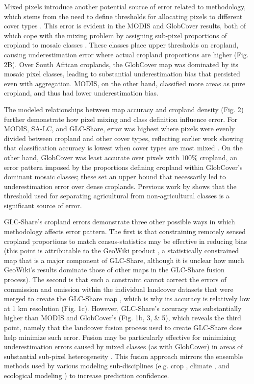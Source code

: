 \documentclass[12 pt, titlepage, a4paper]{article}
\begin{document}
Mixed pixels introduce another potential source of error related to methodology, which stems from the need to define thresholds for allocating pixels to different cover types \citep{ozdogan_resolution_2006}. This error is evident in the MODIS and GlobCover results, both of which cope with the mixing problem by assigning sub-pixel proportions of cropland to mosaic classes \citep{friedl_modis_2010,arino_global_2012}. These classes place upper thresholds on cropland, causing underestimation error where actual cropland proportions are higher  (Fig. 2B). Over South African croplands, the GlobCover map was dominated by its mosaic pixel classes, leading to substantial underestimation bias that persisted even with aggregation. MODIS, on the other hand, classified more areas as pure cropland, and thus had lower underestimation bias.  

The modeled relationships between map accuracy and cropland density (Fig. 2) further demonstrate how pixel mixing and class definition influence error. For MODIS, SA-LC, and GLC-Share, error was highest where pixels were evenly divided between cropland and other cover types, reflecting earlier work showing that classification accuracy is lowest when cover types are most mixed \citep{verburg_challenges_2011,gross_monitoring_2013}. On the other hand, GlobCover was least accurate over pixels with 100\% cropland, an error pattern imposed by the proportions defining cropland within GlobCover's dominant mosaic classes; these set an upper bound that necessarily led to underestimation error over dense croplands. Previous work by \citet{ozdogan_resolution_2006} shows that the threshold used for separating agricultural from non-agricultural classes is a significant source of error.   

GLC-Share's cropland errors demonstrate three other possible ways in which methodology affects error pattern. The first is that constraining remotely sensed cropland proportions to match census-statistics may be effective in reducing bias (this point is attributable to the GeoWiki product \citep{fritz_mapping_2015,fritz_highlighting_2011}, a statistically constrained map that is a major component of GLC-Share, although it is unclear how much GeoWiki's results dominate those of other maps in the GLC-Share fusion process). The second is that such a constraint cannot correct the errors of commission and omission within the individual landcover datasets that were merged to create the GLC-Share map \citep{fritz_mapping_2015}, which is why its accuracy is relatively low at 1 km resolution (Fig. 1c). However, GLC-Share's accuracy was substantially higher than MODIS and GlobCover's (Fig. 1b, 3, \& 5), which reveals the third point, namely that the landcover fusion process used to create GLC-Share does help minimize such error. Fusion may be particularly effective for minimizing underestimation errors caused by mixed classes (as with GlobCover) in areas of substantial sub-pixel heterogeneity \citep{fritz_mapping_2015,tuanmu_global_2014}.  This fusion approach mirrors the ensemble methods used by various modeling sub-disciplines (e.g. crop \citep{asseng_uncertainty_2013}, climate \citep{giorgi_calculation_2002}, and ecological modeling \citep{araujo_ensemble_2007}) to increase prediction confidence.
\end{document}
